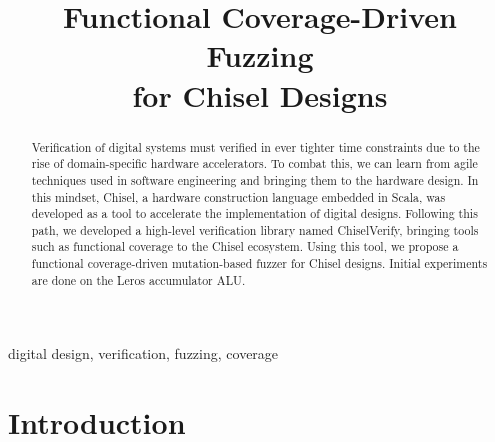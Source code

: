 \documentclass[conference]{IEEEtran}
\begin{document}

\title{Functional Coverage-Driven Fuzzing\\ for Chisel Designs}

\author{


}


\maketitle \thispagestyle{empty}

\begin{abstract}

Verification of digital systems must verified in ever tighter time constraints due to the rise of domain-specific hardware accelerators.
To combat this, we can learn from agile techniques used in software engineering and bringing them to the hardware design.
In this mindset, Chisel, a hardware construction language embedded in Scala, was developed as a tool to accelerate the implementation of digital designs.
Following this path, we developed a high-level verification library named ChiselVerify, bringing tools such as functional coverage to the Chisel ecosystem.
Using this tool, we propose a functional coverage-driven mutation-based fuzzer for Chisel designs.
Initial experiments are done on the Leros accumulator ALU.

\end{abstract}

\begin{IEEEkeywords}
digital design, verification, fuzzing, coverage
\end{IEEEkeywords}
\section{Introduction}
\label{sec:intro}
\end{document}
